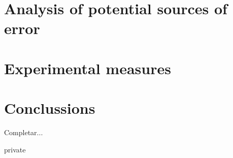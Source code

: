 \documentclass[11pt,a4paper]{report}
\begin{document}
%

\chapter{Analysis of potential sources of error}



\chapter{Experimental measures}


\chapter{Conclussions}
Completar...

\begin{shownto}{private}
\begin{appendices}
%
%
%
%
%
%
%
%

%
\end{appendices}
\end{shownto}
	
%	

\end{document}
